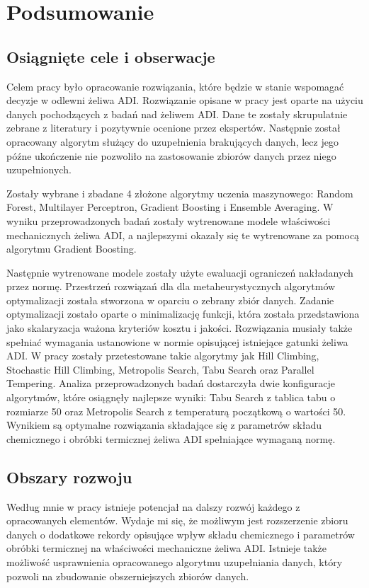 
\chapter{Podsumowanie} \label{chap:conclusions}

\section{Osiągnięte cele i obserwacje}
Celem pracy było opracowanie rozwiązania, które będzie w stanie wspomagać decyzje w odlewni żeliwa ADI. Rozwiązanie opisane w pracy jest oparte na użyciu danych pochodzących z badań nad żeliwem ADI. Dane te zostały skrupulatnie zebrane z literatury i pozytywnie ocenione przez ekspertów. Następnie został opracowany algorytm służący do uzupełnienia brakujących danych, lecz jego późne ukończenie nie pozwoliło na zastosowanie zbiorów danych przez niego uzupełnionych.

Zostały wybrane i zbadane 4 złożone algorytmy uczenia maszynowego: Random Forest, Multilayer Perceptron, Gradient Boosting i Ensemble Averaging. W wyniku przeprowadzonych badań zostały wytrenowane modele właściwości mechanicznych żeliwa ADI, a najlepszymi okazały się te wytrenowane za pomocą algorytmu Gradient Boosting.

Następnie wytrenowane modele zostały użyte ewaluacji ograniczeń nakładanych przez normę. Przestrzeń rozwiązań dla dla metaheurystycznych algorytmów optymalizacji została stworzona w oparciu o zebrany zbiór danych. Zadanie optymalizacji zostało oparte o minimalizację funkcji, która została przedstawiona jako skalaryzacja ważona kryteriów kosztu i jakości. Rozwiązania musiały także spełniać wymagania ustanowione w normie opisującej istniejące gatunki żeliwa ADI. W pracy zostały przetestowane takie algorytmy jak Hill Climbing, Stochastic Hill Climbing, Metropolis Search, Tabu Search oraz Parallel Tempering. Analiza przeprowadzonych badań dostarczyła dwie konfiguracje algorytmów, które osiągnęły najlepsze wyniki: Tabu Search z tablica tabu o rozmiarze 50 oraz Metropolis Search z temperaturą początkową o wartości 50. Wynikiem są optymalne rozwiązania składające się z parametrów składu chemicznego i obróbki termicznej żeliwa ADI spełniające wymaganą normę.

\section{Obszary rozwoju}
Według mnie w pracy istnieje potencjał na dalszy rozwój każdego z opracowanych elementów. Wydaje mi się, że możliwym jest rozszerzenie zbioru danych o dodatkowe rekordy opisujące wpływ składu chemicznego i parametrów obróbki termicznej na właściwości mechaniczne żeliwa ADI. Istnieje także możliwość usprawnienia opracowanego algorytmu uzupełniania danych, który pozwoli na zbudowanie obszerniejszych zbiorów danych. 


